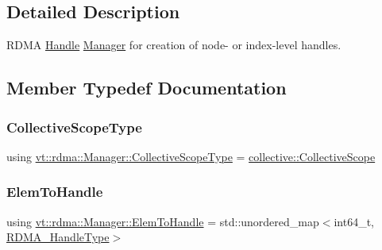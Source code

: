 \subsection{Detailed Description}
R\+D\+MA \hyperlink{structvt_1_1rdma_1_1_handle}{Handle} \hyperlink{structvt_1_1rdma_1_1_manager}{Manager} for creation of node-\/ or index-\/level handles. 

\subsection{Member Typedef Documentation}
\mbox{\label{structvt_1_1rdma_1_1_manager_a7a5509b81547110f71aa85027520cfd5}} 
\subsubsection{\texorpdfstring{Collective\+Scope\+Type}{CollectiveScopeType}}
{\footnotesize\ttfamily using \hyperlink{structvt_1_1rdma_1_1_manager_a7a5509b81547110f71aa85027520cfd5}{vt\+::rdma\+::\+Manager\+::\+Collective\+Scope\+Type} =  \hyperlink{structvt_1_1collective_1_1_collective_scope}{collective\+::\+Collective\+Scope}}

\mbox{\label{structvt_1_1rdma_1_1_manager_ad794893058cec7595bc2bcb466ce7d3f}} 
\subsubsection{\texorpdfstring{Elem\+To\+Handle}{ElemToHandle}}
{\footnotesize\ttfamily using \hyperlink{structvt_1_1rdma_1_1_manager_ad794893058cec7595bc2bcb466ce7d3f}{vt\+::rdma\+::\+Manager\+::\+Elem\+To\+Handle} =  std\+::unordered\+\_\+map$<$int64\+\_\+t, \hyperlink{namespacevt_a10442579ec4e7ebef223818e64bcf908}{R\+D\+M\+A\+\_\+\+Handle\+Type}$>$}

\mbox{\label{structvt_1_1rdma_1_1_manager_aac6e7c58d320c302ea08461941d65f6e}} 

